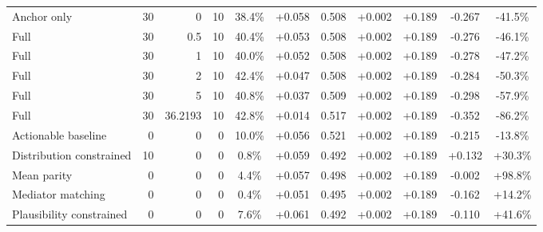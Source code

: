 \begin{table}[htbp]
\begin{tabular}{lrrrccccccc}
Anchor only & 30 & 0 & 10 & 38.4\% & +0.058 & 0.508 & +0.002 & +0.189 & -0.267 & -41.5\% \\
Full & 30 & 0.5 & 10 & 40.4\% & +0.053 & 0.508 & +0.002 & +0.189 & -0.276 & -46.1\% \\
Full & 30 & 1 & 10 & 40.0\% & +0.052 & 0.508 & +0.002 & +0.189 & -0.278 & -47.2\% \\
Full & 30 & 2 & 10 & 42.4\% & +0.047 & 0.508 & +0.002 & +0.189 & -0.284 & -50.3\% \\
Full & 30 & 5 & 10 & 40.8\% & +0.037 & 0.509 & +0.002 & +0.189 & -0.298 & -57.9\% \\
Full & 30 & 36.2193 & 10 & 42.8\% & +0.014 & 0.517 & +0.002 & +0.189 & -0.352 & -86.2\% \\
Actionable baseline & 0 & 0 & 0 & 10.0\% & +0.056 & 0.521 & +0.002 & +0.189 & -0.215 & -13.8\% \\
Distribution constrained & 10 & 0 & 0 & 0.8\% & +0.059 & 0.492 & +0.002 & +0.189 & +0.132 & +30.3\% \\
Mean parity & 0 & 0 & 0 & 4.4\% & +0.057 & 0.498 & +0.002 & +0.189 & -0.002 & +98.8\% \\
Mediator matching & 0 & 0 & 0 & 0.4\% & +0.051 & 0.495 & +0.002 & +0.189 & -0.162 & +14.2\% \\
Plausibility constrained & 0 & 0 & 0 & 7.6\% & +0.061 & 0.492 & +0.002 & +0.189 & -0.110 & +41.6\% \\
\bottomrule
\end{tabular}
\end{table}